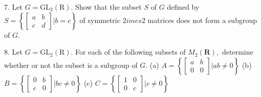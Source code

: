 \begin{mdframed}[style=darkAnswer,frametitle={Joe Starr}]
    
\end{mdframed}
\newpage
\begin{mdframed}[style=darkQuesion]
  7. Let $G=\mathrm{GL}_{2}(\mathrm{R}) .$ Show that the subset $S$ of $G$ defined by $S=\left\{\left[\begin{array}{ll}a & b \\ c & d\end{array}\right] | b=c\right\}$ of symmetric $2   imes 2$ matrices does not form a subgroup of $G .$
    
\end{mdframed}

\begin{mdframed}[style=darkAnswer,frametitle={Joe Starr}]
    
\end{mdframed}
\newpage
\begin{mdframed}[style=darkQuesion]
  8. Let $G=\mathrm{GL}_{2}(\mathrm{R}) .$ For each of the following subsets of $M_{2}(\mathbf{R}),$ determine whether
  or not the subset is a subgroup of $G .$
  (a) $A=\left\{\left[\begin{array}{ll}a & b \\ 0 & 0\end{array}\right] | a b \neq 0\right\}$
  (b) $B=\left\{\left[\begin{array}{ll}0 & b \\ c & 0\end{array}\right] | b c \neq 0\right\}$
  (c) $C=\left\{\left[\begin{array}{ll}1 & 0 \\ 0 & c\end{array}\right] | c \neq 0\right\}$
    
\end{mdframed}

